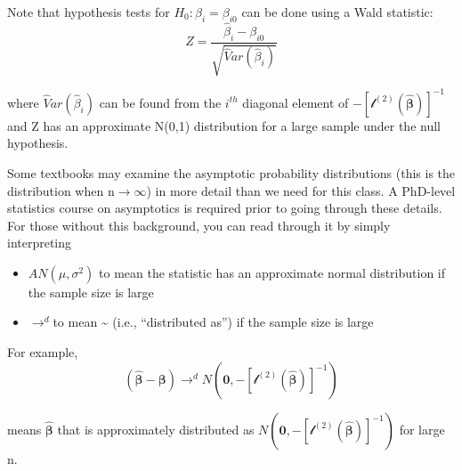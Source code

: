 \documentclass[
]{book}
\providecommand{\tightlist}{%
  \setlength{\itemsep}{0pt}\setlength{\parskip}{0pt}}
\theoremstyle{definition}
\theoremstyle{definition}
\theoremstyle{definition}
\theoremstyle{definition}
\theoremstyle{remark}
\begin{document}
Note that hypothesis tests for \(H_0:\beta_i = \beta_{i0}\) can be done using a Wald statistic: \[Z=\frac{\hat \beta_i- \beta_{i0}}{\sqrt{\hat Var(\hat \beta_i)}}\]

where \(\hat Var(\hat \beta_i)\) can be found from the \(i^{th}\) diagonal element of \(-[\mathcal l^{(2)}(\boldsymbol{\hat{\beta}})]^{-1}\) and Z has an approximate N(0,1) distribution for a large sample under the null hypothesis.

Some textbooks may examine the asymptotic probability distributions (this is the distribution when n\(\to \infty\)) in more detail than we need for this class. A PhD-level statistics course on asymptotics is required prior to going through these details. For those without this background, you can read through it by simply interpreting

\begin{itemize}
\tightlist
\item
  \(AN(\mu, \sigma^2)\) to mean the statistic has an approximate normal distribution if the sample size is large
\item
  \(\to^d\)to mean \textasciitilde{} (i.e., ``distributed as'') if the sample size is large
\end{itemize}

For example, \[(\hat{\boldsymbol \beta}-\boldsymbol \beta)\to^d N(\boldsymbol 0, -[\mathcal l^{(2)}(\boldsymbol{\hat{\beta}})]^{-1})\]

means \(\hat{\boldsymbol \beta}\) that is approximately distributed as \(N(\boldsymbol 0, -[\mathcal l^{(2)}(\boldsymbol{\hat{\beta}})]^{-1})\) for large n.~
\end{document}
